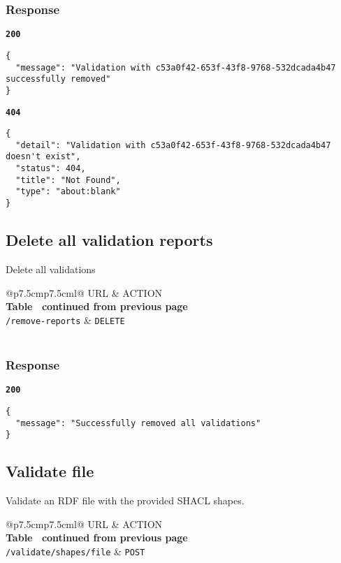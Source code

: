 \subsubsection{Response}
\textbf{\texttt{200}}
\begin{lstlisting}
{
  "message": "Validation with c53a0f42-653f-43f8-9768-532dcada4b47 successfully removed"
}
\end{lstlisting}

\textbf{\texttt{404}}
\begin{lstlisting}
{
  "detail": "Validation with c53a0f42-653f-43f8-9768-532dcada4b47 doesn't exist",
  "status": 404,
  "title": "Not Found",
  "type": "about:blank"
}
\end{lstlisting}

\subsection{Delete all validation reports}
Delete all validations

\begin{longtable}[c]{@{}p{7.5cm}p{7.5cm}l@{}}
  \toprule
  URL                      & ACTION                           \\* \midrule
  \endfirsthead
  \multicolumn{3}{c}%
  {{\bfseries Table \thetable\ continued from previous page}} \\
  \endhead
  \bottomrule
  \endfoot
  \endlastfoot
  \texttt{/remove-reports} & \texttt{DELETE}                  \\* \bottomrule
  \label{tab:rdf-validator-delete-validations}                \\
\end{longtable}

\subsubsection{Response}
\textbf{\texttt{200}}
\begin{lstlisting}
{
  "message": "Successfully removed all validations"
}
\end{lstlisting}

\subsection{Validate file}
Validate an RDF file with the provided SHACL shapes.

\begin{longtable}[c]{@{}p{7.5cm}p{7.5cm}l@{}}
  \toprule
  URL                            & ACTION                     \\* \midrule
  \endfirsthead
  \multicolumn{3}{c}%
  {{\bfseries Table \thetable\ continued from previous page}} \\
  \endhead
  \bottomrule
  \endfoot
  \endlastfoot
  \texttt{/validate/shapes/file} & \texttt{POST}              \\* \bottomrule
  \label{tab:rdf-validator-file}                              \\
\end{longtable}

